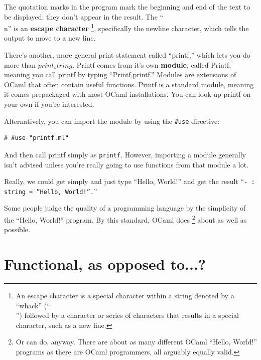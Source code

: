 \documentclass[10pt]{book}
\begin{document}
The quotation marks in the program mark the beginning and end of the text to be displayed; they 
don't appear in the result. The ``\\n'' is an {\bf escape character} \footnote{An escape character 
is a special character within a string denoted by a ``whack'' (``\\'') followed by a character or 
series of characters that results in a special character, such as a new line.}, specifically the 
newline character, which tells the output to move to a new line.


There's another, more general print statement called ``printf,'' which lets you do more than $print_string$.
Printf comes from it's own {\bf module}, called Printf, meaning you call printf by typing ``Printf.printf.''
Modules are extensions of OCaml that often contain useful functions. Printf is a standard module, meaning
it comes prepackaged with most OCaml installations. You can look up printf on your own if you're interested.

Alternatively, you can import the module by using the \verb"#use" directive:

\beforeverb
\begin{verbatim}
# #use "printf.ml"
\end{verbatim}
\afterverb
%
And then call printf simply as {\tt printf}. However, importing a module generally isn't advised  unless you're really going to use functions from that module a lot.


Really, we could get simply and just type ``Hello, World!'' and get the result ``{\tt - : string = ''Hello, World!''.}''

Some people judge the quality of a programming language by the simplicity of the ``Hello, World!'' program.  By this standard, OCaml does \footnote{Or can do, anyway. There are about as many different OCaml ``Hello, World!'' programs as there are OCaml programmers, all arguably equally valid.} about as well as possible.

\section{Functional, as opposed to...?}

\end{document}
